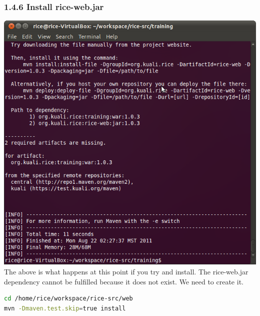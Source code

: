 \subsubsection*{1.4.6 Install rice-web.jar}
\includegraphics[width=\textwidth]{images/Screenshot6.png}
The above is what happens at this point if you try and install. The
rice-web.jar dependency cannot be fulfilled because it does not
exist. We need to create it.

\begin{lstlisting}[language=bash,basicstyle=\scriptsize,backgroundcolor=\color{ubergray},caption={Maven
  commands},frame=single,breaklines=true
]
cd /home/rice/workspace/rice-src/web
mvn -Dmaven.test.skip=true install
\end{lstlisting}

